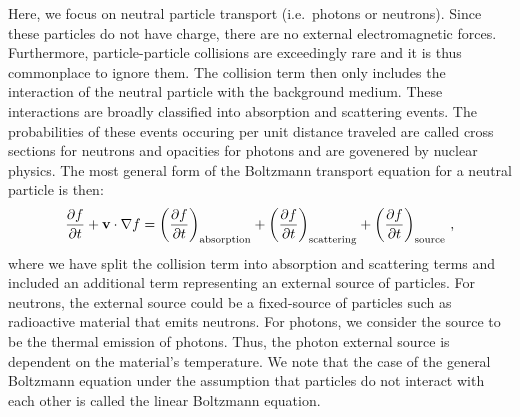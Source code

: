 \documentclass[../doc.tex]{subfiles}
\begin{document}
Here, we focus on neutral particle transport (i.e.~photons or neutrons). Since these particles do not have charge, there are no external electromagnetic forces. Furthermore, particle-particle collisions are exceedingly rare and it is thus commonplace to ignore them. The collision term then only includes the interaction of the neutral particle with the background medium. These interactions are broadly classified into absorption and scattering events. The probabilities of these events occuring per unit distance traveled are called cross sections for neutrons and opacities for photons and are govenered by nuclear physics. The most general form of the Boltzmann transport equation for a neutral particle is then: 
	\begin{equation}
		\frac{\partial f}{\partial t} + \boldsymbol{\mathrm{v}} \cdot \nabla f = \left( \frac{\partial f}{\partial t} \right)_\text{absorption} + \left( \frac{\partial f}{\partial t} \right)_\text{scattering} + \left( \frac{\partial f}{\partial t} \right)_\text{source} \,,
	\end{equation}
where we have split the collision term into absorption and scattering terms and included an additional term representing an external source of particles. For neutrons, the external source could be a fixed-source of particles such as radioactive material that emits neutrons. For photons, we consider the source to be the thermal emission of photons. Thus, the photon external source is dependent on the material's temperature. We note that the case of the general Boltzmann equation under the assumption that particles do not interact with each other is called the linear Boltzmann equation. 
\end{document}
